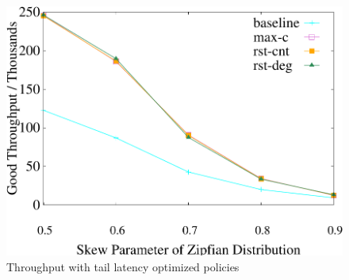 \begin{figure}[t]
\begin{minipage}[b]{0.32\linewidth}
	\end{minipage}
    \begin{minipage}[b]{0.32\linewidth}
        \centering
        \includegraphics[width=\textwidth]{./exp_fig/restart/tps}
        \vspace{-2em}
        \caption{Throughput with tail latency optimized policies}
        \label{fig:restart:tps}
    \end{minipage}
    \vspace{-1em}
\end{figure}


